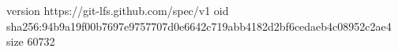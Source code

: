 version https://git-lfs.github.com/spec/v1
oid sha256:94b9a19f00b7697e9757707d0e6642c719abb4182d2bf6cedaeb4c08952c2ae4
size 60732
